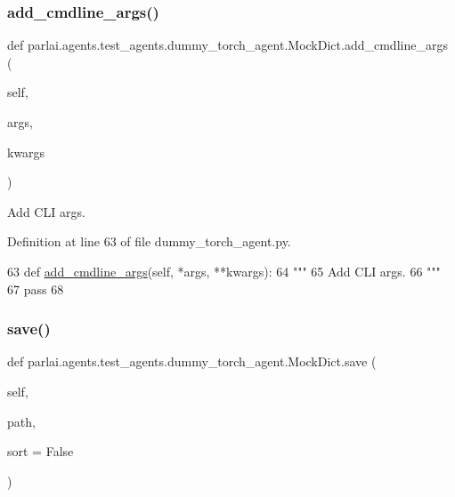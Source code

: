 \subsubsection{\texorpdfstring{add\+\_\+cmdline\+\_\+args()}{add\_cmdline\_args()}}
{\footnotesize\ttfamily def parlai.\+agents.\+test\+\_\+agents.\+dummy\+\_\+torch\+\_\+agent.\+Mock\+Dict.\+add\+\_\+cmdline\+\_\+args (\begin{DoxyParamCaption}\item[{}]{self,  }\item[{}]{args,  }\item[{}]{kwargs }\end{DoxyParamCaption})}

\begin{DoxyVerb}Add CLI args.
\end{DoxyVerb}
 

Definition at line 63 of file dummy\+\_\+torch\+\_\+agent.\+py.


\begin{DoxyCode}
63     \textcolor{keyword}{def }\hyperlink{namespaceparlai_1_1agents_1_1drqa_1_1config_a62fdd5554f1da6be0cba185271058320}{add\_cmdline\_args}(self, *args, **kwargs):
64         \textcolor{stringliteral}{"""}
65 \textcolor{stringliteral}{        Add CLI args.}
66 \textcolor{stringliteral}{        """}
67         \textcolor{keywordflow}{pass}
68 
\end{DoxyCode}
\mbox{\label{classparlai_1_1agents_1_1test__agents_1_1dummy__torch__agent_1_1MockDict_a999f231b74f567c2a897eaac2e354a9b}} 
\subsubsection{\texorpdfstring{save()}{save()}}
{\footnotesize\ttfamily def parlai.\+agents.\+test\+\_\+agents.\+dummy\+\_\+torch\+\_\+agent.\+Mock\+Dict.\+save (\begin{DoxyParamCaption}\item[{}]{self,  }\item[{}]{path,  }\item[{}]{sort = {\ttfamily False} }\end{DoxyParamCaption})}

